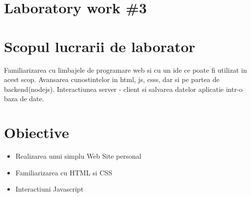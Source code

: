 \section*{Laboratory work \#3}

\section{Scopul lucrarii de laborator}
Familiarizarea cu limbajele de programare web si cu un ide ce poate fi utilizat in acest scop. Avansarea cunostintelor in html, js, csss, dar si pe partea de backend(nodejs). Interactiunea server - client si salvarea datelor aplicatie intr-o baza de date.
\section{Obiective}

\begin{itemize}
\item Realizarea unui simplu Web Site personal
\item Familiarizarea cu HTML si CSS
\item Interactiuni Javascript
	\end{itemize}

\clearpage